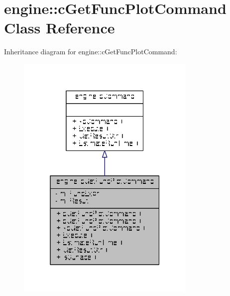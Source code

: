 \hypertarget{classengine_1_1cGetFuncPlotCommand}{\section{engine\-:\-:c\-Get\-Func\-Plot\-Command Class Reference}
\label{classengine_1_1cGetFuncPlotCommand}
}


Inheritance diagram for engine\-:\-:c\-Get\-Func\-Plot\-Command\-:
\nopagebreak
\begin{figure}[H]
\begin{center}
\leavevmode
\includegraphics[width=244pt]{classengine_1_1cGetFuncPlotCommand__inherit__graph}
\end{center}
\end{figure}


